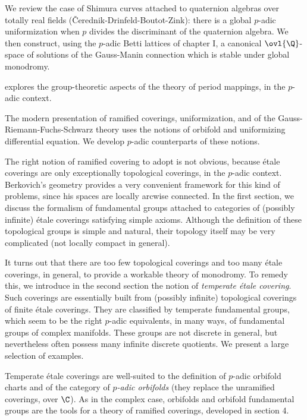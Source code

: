 We review the case of Shimura curves attached to quaternion algebras
over totally real fields (\v{C}erednik-Drinfeld-Boutot-Zink):
there is a global $p$-adic uniformization when $p$ divides the
discriminant of the quaternion algebra. We then construct, using the
$p$-adic Betti lattices of chapter I, a canonical $\ovl{\Q}$-space of
solutions of the Gauss-Manin connection which is stable under global
monodromy.



  explores the group-theoretic aspects of the
 theory of period mappings, in the $p$-adic context.

 The modern presentation of ramified coverings, uniformization, and of
 the Gauss-Riemann-Fuchs-Schwarz theory uses the notions of orbifold and
 uniformizing differential equation. We develop $p$-adic counterparts of
 these notions.

\medskip

The right notion of ramified covering to adopt is not obvious, because
\'etale coverings are only exceptionally topological coverings, in the
$p$-adic context. Ber\-ko\-vich's geometry provides a very convenient
framework for this kind of problems, since his spaces are locally arcwise
connected.  In the first section, we discuss the formalism of
fundamental groups attached to categories of (possibly infinite) \'etale
coverings satisfying simple axioms. Although the definition of these
topological groups is simple and natural, their topology itself may be
very complicated (not locally compact in general).

It turns out that there are too few topological coverings and too many
\'etale coverings, in general, to provide a workable theory of
monodromy. To remedy this, we introduce in the second section the notion
of {\it temperate \'etale covering}. Such coverings are essentially
built from (possibly infinite) topological coverings of finite \'etale
coverings. They are classified by temperate fundamental groups, which
seem to be the right $p$-adic equivalents, in many ways, of fundamental
groups of complex manifolds. These groups are not discrete in general,
but nevertheless often possess many infinite discrete quotients. We
present a large selection of examples.

\medskip Temperate \'etale coverings are well-suited to the definition
of $p$-adic orbifold charts and of the category of {\it $p$-adic
orbifolds} (they replace the unramified coverings, over $\C$). As in the
complex case, orbifolds and orbifold fundamental groups are the tools
for a theory of ramified coverings, developed in section 4.

